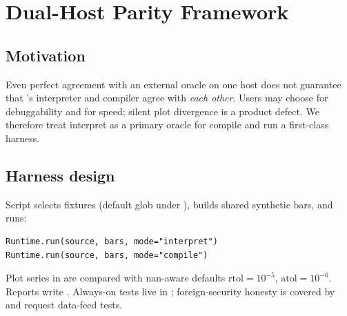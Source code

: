 \documentclass[11pt,a4paper]{article}
\begin{document}
\section{Dual-Host Parity Framework}
\label{sec:dual}

\subsection{Motivation}
Even perfect agreement with an external oracle on one host does not guarantee
that \pyne{}'s interpreter and compiler agree with \emph{each other}.
Users may choose  for debuggability and
 for speed; silent plot divergence is a product defect.
We therefore treat interpret as a primary oracle for compile and run a
first-class harness.

\subsection{Harness design}
Script  selects fixtures (default
glob under ), builds shared synthetic bars,
and runs:
\begin{lstlisting}[style=python,basicstyle=\ttfamily\scriptsize]
Runtime.run(source, bars, mode="interpret")
Runtime.run(source, bars, mode="compile")
\end{lstlisting}
Plot series in  are compared with nan-aware
 defaults $\mathrm{rtol}=10^{-5}$, $\mathrm{atol}=10^{-6}$.
Reports write .
Always-on tests live in ;
foreign-security honesty is covered by
 and request data-feed tests.
\end{document}
